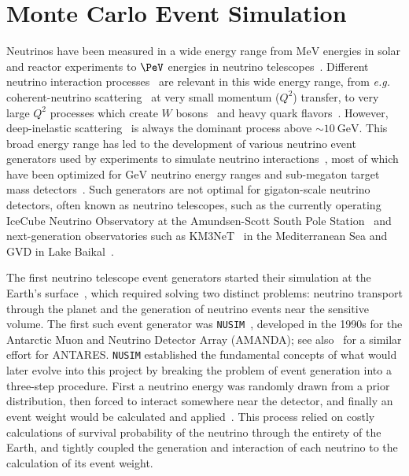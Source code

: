 \documentclass[main.tex]{subfiles}
\newcommand{\nusim}{\texttt{NUSIM}}
\begin{document}
\section{Monte Carlo Event Simulation}

Neutrinos have been measured in a wide energy range from $\si\MeV$ energies in solar and reactor experiments to $\si\PeV$ energies in neutrino telescopes~\cite{Vitagliano:2019yzm}.
Different neutrino interaction processes~\cite{Formaggio:2013kya} are relevant in this wide energy range, from \textit{e.g.} coherent-neutrino scattering~\cite{Akimov1123} at very small momentum ($Q^2$) transfer, to very large $Q^2$ processes which create $W$ bosons~\cite{Glashow:1960zz,Seckel:1997kk,Alikhanov:2014uja,Zhou:2019vxt,Beacom:2019pzs} and heavy quark flavors~\cite{Barge:2016uzn}.
However, deep-inelastic scattering~\cite{Gandhi:1995tf} is always the dominant process above $\sim\SI{10}\GeV$.
This broad energy range has led to the development of various neutrino event generators used by experiments to simulate neutrino interactions~\cite{Hayato:2002sd,Andreopoulos:2009rq,Golan:2012rfa,Lalakulich:2011eh}, most of which have been optimized for $\si\GeV$ neutrino energy ranges and sub-megaton target mass detectors~\cite{Andreopoulos:2009rq}.
Such generators are not optimal for gigaton-scale neutrino detectors, often known as neutrino telescopes, such as the currently operating IceCube Neutrino Observatory at the Amundsen-Scott South Pole Station~\cite{Aartsen:2016nxy} and next-generation observatories such as KM3NeT~\cite{Adrian-Martinez:2016fdl} in the Mediterranean Sea and GVD in Lake Baikal~\cite{Avrorin:2018ijk}.

The first neutrino telescope event generators started their simulation at the Earth's surface~\cite{osti_5884484,Hill:1996hzh,Gazizov:2004va,Yoshida:2003js}, which required solving two distinct problems: neutrino transport through the planet and the generation of neutrino events near the sensitive volume.
The first such event generator was \nusim{}~\cite{Hill:1996hzh}, developed in the 1990s for the Antarctic Muon and Neutrino Detector Array (AMANDA); see also~\cite{Bailey:2002} for a similar effort for ANTARES. 
\nusim{} established the fundamental concepts of what would later evolve into this project by breaking the problem of event generation into a three-step procedure. 
First a neutrino energy was randomly drawn from a prior distribution, then forced to interact somewhere near the detector, and finally an event weight would be calculated and applied~\cite{Hill:1996hzh}.
This process relied on costly calculations of survival probability of the neutrino through the entirety of the Earth, and tightly coupled the generation and interaction of each neutrino to the calculation of its event weight.
\end{document}
